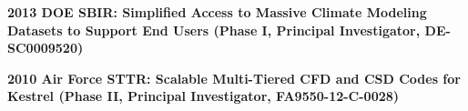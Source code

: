 \begin{itemize}
 	
 	
 	\textbf{2013 DOE SBIR: Simplified Access to Massive Climate
 		Modeling Datasets to Support End Users (Phase I, Principal
 		Investigator, DE-SC0009520)}
 	
 	
 	
 	
 	\textbf{2010 Air Force STTR: Scalable Multi-Tiered CFD and CSD
 		Codes for Kestrel (Phase II, Principal Investigator,
 		FA9550-12-C-0028)}
 	
 	

\end{itemize}
